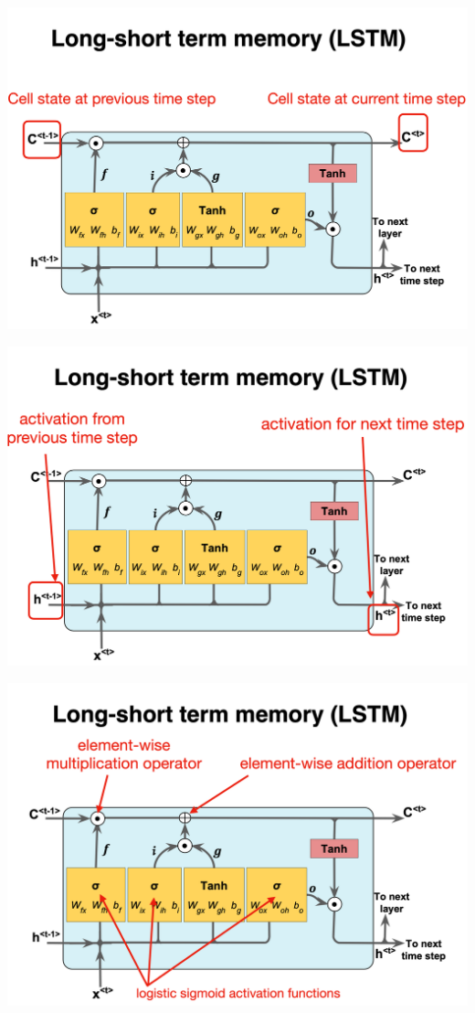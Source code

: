 \documentclass[%
oneside,                 %
final,                   %
10pt]{article}
\begin{document}
\vspace{6mm}

\vspace{6mm}

\centerline{\includegraphics[width=0.9\linewidth]{figslides/RNN15.png}}

\vspace{6mm}

\vspace{6mm}

\centerline{\includegraphics[width=0.9\linewidth]{figslides/RNN16.png}}

\vspace{6mm}

\vspace{6mm}

\centerline{\includegraphics[width=0.9\linewidth]{figslides/RNN17.png}}
\end{document}
